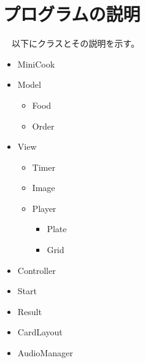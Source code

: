 \documentclass[a4j]{jarticle} %
\begin{document}
\section{プログラムの説明}
　以下にクラスとその説明を示す。
\begin{itemize}
  \item MiniCook\par
  \item Model\par
  \begin{itemize}
    \item Food\par
    \item Order\par
  \end{itemize}   
  \item View\par
  \begin{itemize}
    \item Timer\par
    \item Image\par
    \item Player\par
    \begin{itemize}
      \item Plate\par
      \item Grid\par
    \end{itemize}   
  \end{itemize}  
  \item Controller\par
  \item Start\par
  \item Result\par
  \item CardLayout\par
  \item AudioManager\par
\end{itemize}
\end{document}

